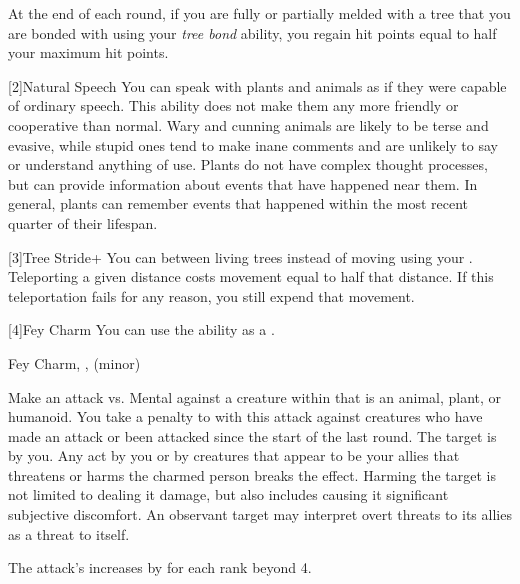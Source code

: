             At the end of each round, if you are fully or partially melded with a tree that you are bonded with using your \textit{tree bond} ability, you regain hit points equal to half your maximum hit points.

            [2]{Natural Speech} You can speak with plants and animals as if they were capable of ordinary speech.
                This ability does not make them any more friendly or cooperative than normal.
                Wary and cunning animals are likely to be terse and evasive, while stupid ones tend to make inane comments and are unlikely to say or understand anything of use.
                Plants do not have complex thought processes, but can provide information about events that have happened near them.
                In general, plants can remember events that happened within the most recent quarter of their lifespan.

            [3]{Tree Stride+} You can  between living trees instead of moving using your .
            Teleporting a given distance costs movement equal to half that distance.
            If this teleportation fails for any reason, you still expend that movement.

            [4]{Fey Charm} You can use the  ability as a .
            \begin{magicalsustainability}{Fey Charm}{, ,  (minor)}
                \rankline
                \noindent

                Make an attack vs. Mental against a creature within \medrange that is an animal, plant, or humanoid.
                You take a  penalty to  with this attack against creatures who have made an attack or been attacked since the start of the last round.
                \hit The target is \charmed by you.
                Any act by you or by creatures that appear to be your allies that threatens or harms the charmed person breaks the effect.
                Harming the target is not limited to dealing it damage, but also includes causing it significant subjective discomfort.
                An observant target may interpret overt threats to its allies as a threat to itself.

                \rankline

                \noindent The attack's  increases by  for each rank beyond 4.
            \end{magicalsustainability}

